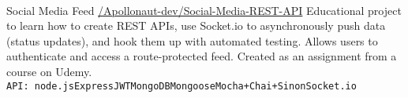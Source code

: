 \documentclass[9pt]{developercv} %
\begin{document}
\begin{entrylist}
  \\
  \entryproject
    {Social Media Feed}
    {\href{https://github.com/Apollonaut-dev/Social-Media-REST-API}{/Apollonaut-dev/Social-Media-REST-API}}
    {Educational project to learn how to create REST APIs, use Socket.io to asynchronously push data (status updates), and hook them up with automated testing. Allows users to authenticate and access a route-protected feed. Created as an assignment from a course on Udemy. \smallskip \\\texttt{API: }\texttt{node.js}\slashsep\texttt{Express}\slashsep\texttt{JWT}\slashsep\texttt{MongoDB}\slashsep\texttt{Mongoose}\slashsep\texttt{Mocha+Chai+Sinon}\slashsep\texttt{Socket.io}}
\end{entrylist}



\end{document}
